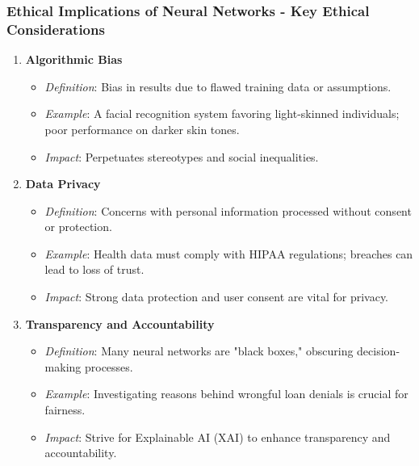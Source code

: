\documentclass[aspectratio=169]{beamer}
\begin{document}
\begin{frame}[fragile]
    \frametitle{Ethical Implications of Neural Networks - Key Ethical Considerations}
    \begin{enumerate}
        \item \textbf{Algorithmic Bias}  
        \begin{itemize}
            \item \textit{Definition}: Bias in results due to flawed training data or assumptions.
            \item \textit{Example}: A facial recognition system favoring light-skinned individuals; poor performance on darker skin tones.
            \item \textit{Impact}: Perpetuates stereotypes and social inequalities.
        \end{itemize}

        \item \textbf{Data Privacy}  
        \begin{itemize}
            \item \textit{Definition}: Concerns with personal information processed without consent or protection.
            \item \textit{Example}: Health data must comply with HIPAA regulations; breaches can lead to loss of trust.
            \item \textit{Impact}: Strong data protection and user consent are vital for privacy.
        \end{itemize}
        
        \item \textbf{Transparency and Accountability}  
        \begin{itemize}
            \item \textit{Definition}: Many neural networks are "black boxes," obscuring decision-making processes.
            \item \textit{Example}: Investigating reasons behind wrongful loan denials is crucial for fairness.
            \item \textit{Impact}: Strive for Explainable AI (XAI) to enhance transparency and accountability.
        \end{itemize}
    \end{enumerate}
\end{frame}
\end{document}
